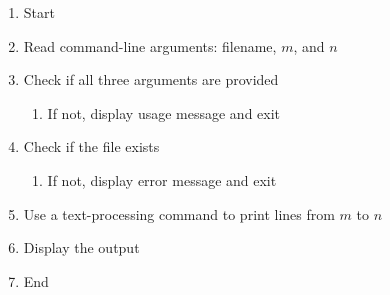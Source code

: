 \begin{enumerate}
    \item Start
    \item Read command-line arguments: filename, $m$, and $n$
    \item Check if all three arguments are provided
    \begin{enumerate}
        \item If not, display usage message and exit
    \end{enumerate}
    \item Check if the file exists
    \begin{enumerate}
        \item If not, display error message and exit
    \end{enumerate}
    \item Use a text-processing command to print lines from $m$ to $n$
    \item Display the output
    \item End
\end{enumerate}

